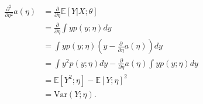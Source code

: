\begin{answer}
    \begin{align*}
\frac{\partial^2}{\partial{\eta}^2} a(\eta) &= \frac{\partial}{\partial \eta}
\mathbb{E}[Y|X;\theta] \\ &= \frac{\partial}{\partial{\eta}} \int y p(y;\eta)dy
\\
&= \int yp(y;\eta)\left(y - \frac{\partial}{\partial \eta}a(\eta)\right)dy \\
&= \int y^2 p(y;\eta)dy - \frac{\partial}{\partial \eta} a(\eta) \int y
p(y;\eta)dy \\
        &= \mathbb{E}[Y^2; \eta] - \mathbb{E}[Y;\eta]^2 \\
        &= \text{Var}(Y; \eta).
    \end{align*}
\end{answer}
